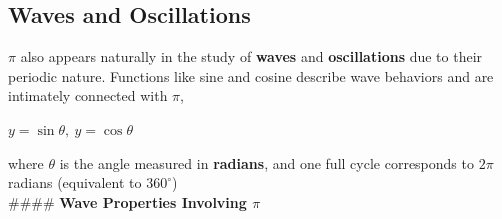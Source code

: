 \documentclass[12pt]{article}
\begin{document}
\subsection{Waves and Oscillations}

$\pi$ also appears naturally in the study of \textbf{waves} and \textbf{oscillations} due to their periodic nature. Functions like sine and cosine describe wave behaviors and are intimately connected with $\pi$,
\begin{center}
    $y = \sin\theta, \ y = \cos\theta$
\end{center}
where $\theta$ is the angle measured in \textbf{radians}, and one full cycle corresponds to $2\pi$ radians (equivalent to $360^\circ$)\\

#### \textbf{Wave Properties Involving $\pi$}
\end{document}

